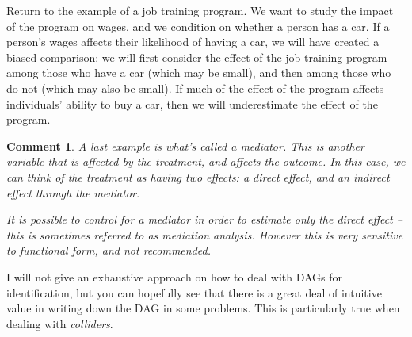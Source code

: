 \documentclass{tufte-handout}
\theoremstyle{break}
\newtheorem{cmt}{Comment}
\newcommand{\continuation}{??}
\newenvironment{continueexample}[1]
 {\renewcommand{\continuation}{\ref{#1}}\excont[continued]}
 {\endexcont}
\begin{document}
\begin{boxD}
\begin{continueexample}{ex:example2}
  Return to the example of a job training program. We want to study the impact of the program on wages, and we condition on whether a person has a car. If a person's wages affects their likelihood of having a car, we will have created a biased comparison: we will first consider the effect of the job training program among those who have a car (which may be small), and then among those who do not (which may also be small). If much of the effect of the program affects individuals' ability to buy a car, then we will underestimate the effect of the program.
\end{continueexample}
\end{boxD}
 
\begin{boxF}
  \begin{cmt}
    A last example is what's called a \emph{mediator}. This is another variable that is affected by the treatment, and affects the outcome. In this case, we can think of the treatment as having two effects: a direct effect, and an indirect effect through the mediator. 

    \centering  {}

\raggedright
    It is possible to control for a mediator in order to estimate only the direct effect -- this is sometimes referred to as mediation analysis. However this is \emph{very} sensitive to functional form, and not recommended.
  \end{cmt}
\end{boxF}

I will not give an exhaustive approach on how to deal with DAGs for identification, but you can hopefully see that there is a great deal of intuitive value in writing down the DAG in some problems. This is particularly true when dealing with \emph{colliders}. 
\end{document}
